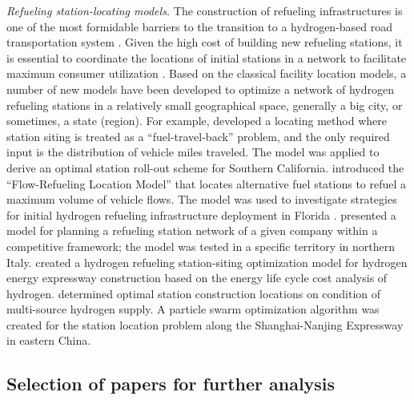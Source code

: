 \documentclass[11pt,3p]{elsarticle}
\begin{document}
\textit{Refueling station-locating models.} The construction of refueling infrastructures is one of the most formidable barriers to the transition to a hydrogen-based road transportation system \citep{national2004hydrogen}. Given the high cost of building new refueling stations, it is essential to coordinate the locations of initial stations in a network to facilitate maximum consumer utilization \citep{kuby2009optimization}. Based on the classical facility location models, a number of new models have been developed to optimize a network of hydrogen refueling stations in a relatively small geographical space, generally a big city, or sometimes, a state (region). For example, \citet{lin2008fuel} developed a locating method where station siting is treated as a ``fuel-travel-back'' problem, and the only required input is the distribution of vehicle miles traveled. The model was applied to derive an optimal station roll-out scheme for Southern California. \citet{kuby2005flow} introduced the ``Flow-Refueling Location Model'' that locates alternative fuel stations to refuel a maximum volume of vehicle flows. The model was used to investigate strategies for initial hydrogen refueling infrastructure deployment in Florida \citep{kuby2009optimization}. \citet{bersani2009network} presented a model for planning a refueling station network of a given company within a competitive framework; the model was tested in a specific territory in northern Italy. \citet{he2017hydrogen} created a hydrogen refueling station-siting optimization model for hydrogen energy expressway construction based on the energy life cycle cost analysis of hydrogen. \citet{sun2017hydrogen} determined optimal station construction locations on condition of multi-source hydrogen supply. A particle swarm optimization algorithm was created for the station location problem along the Shanghai-Nanjing Expressway in eastern China. 

\subsection{Selection of papers for further analysis}
\end{document}
